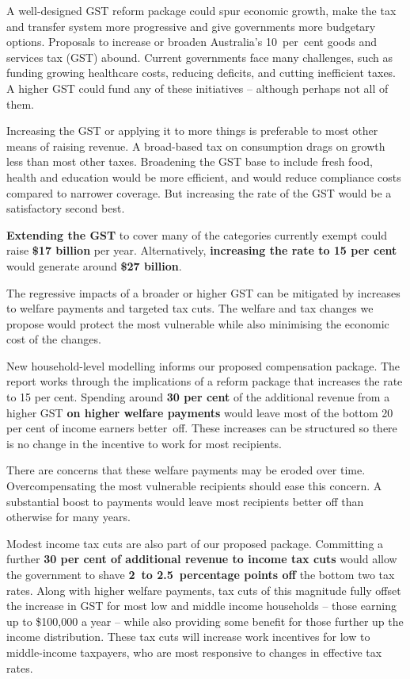 

\setlength{\overviewextra}{2pt}
\addtolength{\columnsep}{\overviewextra}
\begin{overview}[-20pt]
A well-designed GST reform package could spur economic growth, 
make the tax and transfer system more progressive and give governments more budgetary options.
Proposals to increase or broaden Australia’s 10~per~cent goods and services tax (GST) abound. Current governments face many challenges, such as funding growing healthcare costs, reducing deficits, and cutting inefficient taxes. A higher GST could fund any of these initiatives – although perhaps not all of them. 

Increasing the GST or applying it to more things is preferable to most other means of raising revenue. A broad-based tax on consumption drags on growth less than most other taxes. Broadening the GST base to include fresh food, health and education would be more efficient, and would reduce compliance costs compared to narrower coverage. But increasing the rate of the GST would be a satisfactory second best.  

\textbf{Extending the GST} to cover many of the categories currently exempt could raise \textbf{\$17 billion} per year. Alternatively, \textbf{increasing the rate to 15 per cent} would generate around \textbf{\$27 billion}. 

The regressive impacts of a broader or higher GST can be mitigated by increases to welfare payments and targeted tax cuts. The welfare and tax changes we propose would protect the most vulnerable while also minimising the economic cost of the changes. 

New household-level modelling informs our proposed compensation package. The report works through the implications of a reform package that increases the rate to 15 per cent. Spending around \textbf{30 per cent} of the additional revenue from a higher GST \textbf{on higher welfare payments} would leave most of the bottom 20 per cent of income earners better~off. These increases can be structured so there is no change in the incentive to work for most recipients. 

There are concerns that these welfare payments may be eroded over time. Overcompensating the most vulnerable recipients should ease this concern. A substantial boost to payments would leave most recipients better off than otherwise for many years.

Modest income tax cuts are also part of our proposed package. Committing a further \textbf{30 per cent of additional revenue to income tax cuts} would allow the government to shave \textbf{2~to 2.5~percentage points off} the bottom two tax rates. Along with higher welfare payments, tax cuts of this magnitude fully offset the increase in GST for most low and middle income households – those earning up to \$100,000 a year – while also providing some benefit for those further up the income distribution. These tax cuts will increase work incentives for low to middle-income taxpayers, who are most responsive to changes in effective tax rates. 


\end{overview}
